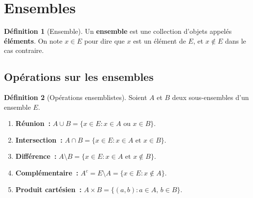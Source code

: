 \documentclass[12pt,a4paper,openany]{book}
\theoremstyle{definition}
\newtheorem{definition}{Définition}[chapter]
\begin{document}
\section{Ensembles}
\label{sec:ensembles}

\begin{definition}[Ensemble]\label{def:ensemble}
  Un \textbf{ensemble} est une collection d'objets appelés \textbf{éléments}. On note $x \in E$ pour dire que $x$ est un élément de $E$, et $x \notin E$ dans le cas contraire.
\end{definition}

\subsection{Opérations sur les ensembles}

\begin{definition}[Opérations ensemblistes]\label{def:ops-ens}
  Soient $A$ et $B$ deux sous-ensembles d'un ensemble $E$.
  \begin{enumerate}[label=(\roman*)]
    \item \textbf{Réunion~:} $A \cup B = \{x \in E : x \in A \text{ ou } x \in B\}$.
    \item \textbf{Intersection~:} $A \cap B = \{x \in E : x \in A \text{ et } x \in B\}$.
    \item \textbf{Différence~:} $A \setminus B = \{x \in E : x \in A \text{ et } x \notin B\}$.
    \item \textbf{Complémentaire~:} $A^c = E \setminus A = \{x \in E : x \notin A\}$.
    \item \textbf{Produit cartésien~:} $A \times B = \{(a,b) : a \in A,\, b \in B\}$.
  \end{enumerate}
\end{definition}
\end{document}

